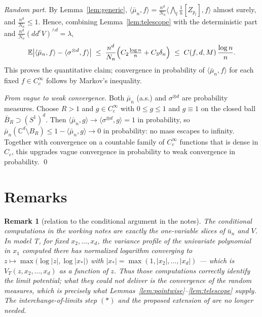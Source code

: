 \documentclass[12pt]{article}
\def\C{\mathbb{C}}
\def\E{\mathbb{E}}
\def\ddc{dd^c}
\newtheorem{remark}{Remark}[section]
\begin{document}
\emph{Random part.} By Lemma~\ref{lem:generic},
$\langle \bar\mu_n, f\rangle = \frac{n^d}{N_n} \bigl\langle \bigwedge_l \frac1n
[Z_{p_l}], f \bigr\rangle$ almost surely, and $\frac{n^d}{N_n} \le 1$. Hence, combining
Lemma~\ref{lem:telescope} with the deterministic part and
$\frac{n^d}{N_n}(\ddc V)^{\wedge d} = \lambda$,
\[
  \E \bigl| \langle \bar\mu_n, f \rangle - \langle \sigma^{\otimes d}, f\rangle \bigr|
  \;\le\; \frac{n^d}{N_n}\Bigl( C_2 \tfrac{\log n}{n} + C_3 \delta_n \Bigr)
  \;\le\; C(f,d,M)\, \frac{\log n}{n} .
\]
This proves the quantitative claim; convergence in probability of
$\langle \bar\mu_n, f\rangle$ for each fixed $f \in C^\infty_c$ follows by Markov's
inequality.

\emph{From vague to weak convergence.} Both $\bar\mu_n$ (a.s.) and $\sigma^{\otimes d}$
are probability measures. Choose $R > 1$ and $g \in C^\infty_c$ with
$0 \le g \le 1$ and $g \equiv 1$ on the closed ball $\bar B_R \supset (S^1)^d$. Then
$\langle \bar\mu_n, g\rangle \to \langle \sigma^{\otimes d}, g \rangle = 1$ in
probability, so $\bar\mu_n(\C^d \setminus B_R) \le 1 - \langle \bar\mu_n, g\rangle \to
0$ in probability: no mass escapes to infinity. Together with convergence on a countable
family of $C^\infty_c$ functions that is dense in $C_c$, this upgrades vague convergence
in probability to weak convergence in probability. \qed

\section{Remarks}

\begin{remark}[relation to the conditional argument in the notes]\label{rem:slices}
The conditional computations in the working notes are exactly the one-variable slices of
$\bar u_n$ and $V$. In model T, for fixed $x_2,\dots,x_d$, the variance profile of the
univariate polynomial in $x_1$ computed there has normalized logarithm converging to
$z \mapsto \max\bigl(\log|z|, \log|x_*|\bigr)$ with $|x_*| = \max(1, |x_2|, \dots,
|x_d|)$ --- which is $V_T(z, x_2, \dots, x_d)$ as a function of $z$. Thus those
computations correctly identify the limit potential; what they could not deliver is the
convergence of the random measures, which is precisely what
Lemmas~\ref{lem:pointwise}--\ref{lem:telescope} supply. The interchange-of-limits step
$(*)$ and the proposed extension of \cite[Lemma B.1]{BN} are no longer needed.
\end{remark}
\end{document}
